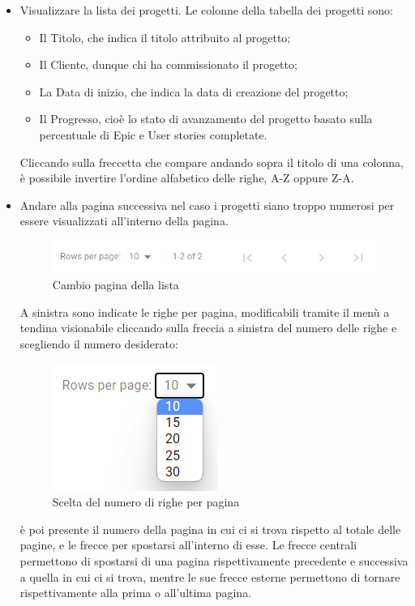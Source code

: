 \documentclass{article}
\begin{document}
\begin{itemize}
    \item Visualizzare la lista dei progetti. Le colonne della tabella dei progetti sono:
    \begin{itemize}
        \item Il Titolo, che indica il titolo attribuito al progetto;
        \item Il Cliente, dunque chi ha commissionato il progetto;
        \item La Data di inizio, che indica la data di creazione del progetto;
        \item Il Progresso, cioè lo stato di avanzamento del progetto basato sulla percentuale di Epic e User stories completate.
    \end{itemize}
    Cliccando sulla freccetta che compare andando sopra il titolo di una colonna, è possibile invertire l'ordine alfabetico delle righe, A-Z oppure Z-A.
    \item Andare alla pagina successiva nel caso i progetti siano troppo numerosi per essere visualizzati all'interno della pagina. 
    \begin{figure}[H]
      \centering
      \includegraphics[width=\textwidth]{documenti/Screenshot manuale utente/cambio pagina.png}
      \caption{Cambio pagina della lista}
      \label{paginalista}
    \end{figure} 
    A sinistra sono indicate le righe per pagina, modificabili tramite il menù a tendina visionabile cliccando sulla freccia a sinistra del numero delle righe e scegliendo il numero desiderato:
        \begin{figure}[H]
      \centering
      \includegraphics{documenti/Screenshot manuale utente/scelta righe per pagina.png}
      \caption{Scelta del numero di righe per pagina}
      \label{nrighepad}
    \end{figure} 
    è poi presente il numero della pagina in cui ci si trova rispetto al totale delle pagine, e le frecce per spostarsi all'interno di esse. Le frecce centrali permettono di spostarsi di una pagina rispettivamente precedente e successiva a quella in cui ci si trova, mentre le sue frecce esterne permettono di tornare rispettivamente alla prima o all'ultima pagina.
\end{itemize}
\end{document}
